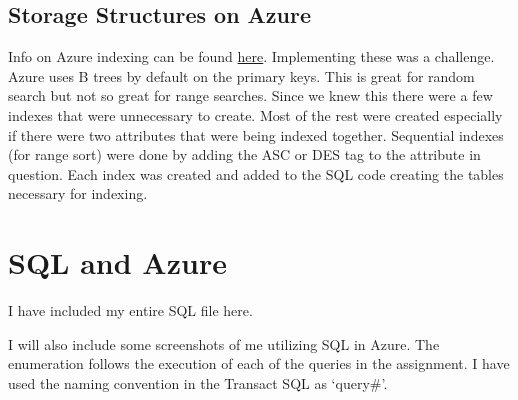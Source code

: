 \documentclass[11pt]{article}
\begin{document}
\subsection{Storage Structures on Azure}
Info on Azure indexing can be found \href{https://learn.microsoft.com/en-us/sql/relational-databases/indexes/indexes?view=sql-server-ver16}{here}.  Implementing these was a challenge.  Azure uses B trees by default on the primary keys.  This is great for random search but not so great for range searches.  Since we knew this there were a few indexes that were unnecessary to create.  Most of the rest were created especially if there were two attributes that were being indexed together.  Sequential indexes (for range sort) were done by adding the ASC or DES tag to the attribute in question.  Each index was created and added to the SQL code creating the tables necessary for indexing.

\section{SQL and Azure}

I have included my entire SQL file here.


I will also include some screenshots of me utilizing SQL in Azure.  The enumeration follows the execution of each of the queries in the assignment.  I have used the naming convention in the Transact SQL as `query\#'. 
\end{document}
